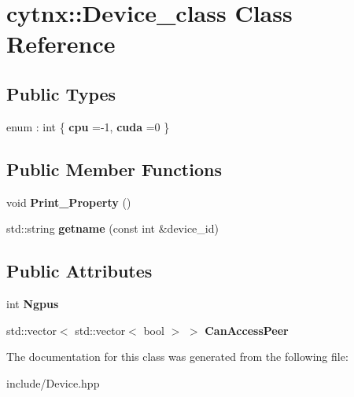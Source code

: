\hypertarget{classcytnx_1_1Device__class}{}\section{cytnx\+:\+:Device\+\_\+class Class Reference}
\label{classcytnx_1_1Device__class}
\subsection*{Public Types}
\begin{DoxyCompactItemize}
\item 
\mbox{\label{classcytnx_1_1Device__class_a28e9007238c5002a09aa6ff1b4442f1a}} 
enum \+: int \{ {\bfseries cpu} =-\/1, 
{\bfseries cuda} =0
 \}
\end{DoxyCompactItemize}
\subsection*{Public Member Functions}
\begin{DoxyCompactItemize}
\item 
\mbox{\label{classcytnx_1_1Device__class_a90487a7da05cabfa34d6639d29b1390b}} 
void {\bfseries Print\+\_\+\+Property} ()
\item 
\mbox{\label{classcytnx_1_1Device__class_a40a60a858bbfb7392ca19e1b2d007c05}} 
std\+::string {\bfseries getname} (const int \&device\+\_\+id)
\end{DoxyCompactItemize}
\subsection*{Public Attributes}
\begin{DoxyCompactItemize}
\item 
\mbox{\label{classcytnx_1_1Device__class_a9735ca67a2bc0b6aec1981670fdf4c91}} 
int {\bfseries Ngpus}
\item 
\mbox{\label{classcytnx_1_1Device__class_abbe1f6042937c5d9d1082c9f22c6e290}} 
std\+::vector$<$ std\+::vector$<$ bool $>$ $>$ {\bfseries Can\+Access\+Peer}
\end{DoxyCompactItemize}


The documentation for this class was generated from the following file\+:\begin{DoxyCompactItemize}
\item 
include/Device.\+hpp\end{DoxyCompactItemize}
